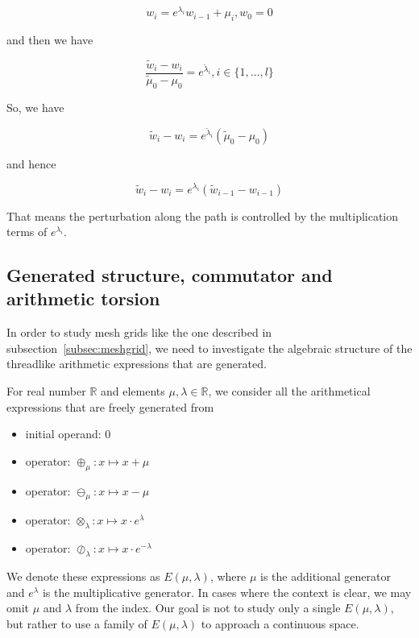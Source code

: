 \[
w_i = e^{\lambda_i} w_{i-1} + \mu_i, w_0 = 0
\]

and then we have

\begin{equation}
\frac{\tilde{w}_i - w_i}{\tilde{\mu}_0 - \mu_0} = e^{\check{\lambda}_i}, i \in \{1, ..., l\}\label{eq:perturbation1}
\end{equation}

So, we have

\[
\tilde{w}_i - w_i = e^{\check{\lambda}_i} (\tilde{\mu}_0 - \mu_0)
\]

and hence

\begin{equation}
\tilde{w}_i - w_i = e^{\lambda_i}(\tilde{w}_{i - 1} - w_{i - 1})\label{eq:perturbation2}
\end{equation}

That means the perturbation along the path is controlled by the multiplication terms of $e^{\lambda_i}$.

\subsection{Generated structure, commutator and arithmetic torsion}\label{subsec:generated-structure}

In order to study mesh grids like the one described in subsection~\ref{subsec:meshgrid},
we need to investigate the algebraic structure of the threadlike arithmetic expressions that are generated.

For real number $\mathbb{R}$ and elements $\mu, \lambda \in \mathbb{R}$, we consider all the arithmetical expressions
that are freely generated from
\begin{itemize}
    \item initial operand: $0$
    \item operator: $\oplus_\mu: x \mapsto x + \mu$
    \item operator: $\ominus_\mu: x \mapsto x - \mu$
    \item operator: $\otimes_\lambda: x \mapsto x \cdot e^\lambda$
    \item operator: $\oslash_\lambda: x \mapsto x \cdot e^{- \lambda}$
\end{itemize}

We denote these expressions as $E(\mu, \lambda)$, where $\mu$ is the additional generator and $e^\lambda$ is the multiplicative generator.
In cases where the context is clear, we may omit $\mu$ and $\lambda$ from the index.
Our goal is not to study only a single $E(\mu, \lambda)$, but rather to use a family of $E(\mu, \lambda)$ to approach a continuous space.

